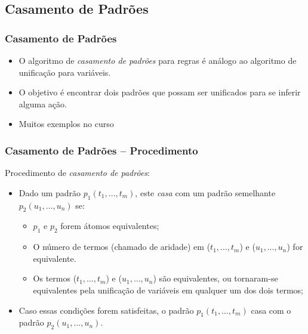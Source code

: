 
\subsection{Casamento de Padrões}

\begin{frame}[fragile]
\frametitle{Casamento de Padrões}

\begin{itemize}

\item O algoritmo de {\em casamento de padrões} para regras é análogo ao algoritmo de    unificação para variáveis. 

\item O objetivo é encontrar dois padrões que possam ser unificados para se inferir alguma ação.

\pause
\item Muitos exemplos no curso

\end{itemize}
\end{frame}



\begin{frame}[fragile]
\frametitle{Casamento de Padrões -- Procedimento}


Procedimento de {\em casamento de padrões}:

\begin{itemize}
	\item Dado um padrão $p_1(t_1, \ldots,t_m)$, este \emph{casa} 
	com um padrão semelhante $p_2(u_1, \ldots,u_n)$ se:
    
    \begin{itemize}
    	\item $p_1$ e $p_2$ forem átomos equivalentes;
    
        \item O número de termos (chamado de aridade) em ($t_1, \ldots,t_m$)
        e ($u_1, \ldots,u_n$) for equivalente.
    
    	\item Os termos ($t_1, \ldots,t_m$) e ($u_1, \ldots,u_n$) são equivalentes, ou tornaram-se  equivalentes pela unificação de variáveis	em qualquer um dos dois termos;
    \end{itemize}
    
    \item Caso essas condições forem satisfeitas, o padrão $p_1(t_1,\ldots,t_m)$  casa com o padrão $p_2(u_1, \ldots,u_n)$.
    
\end{itemize}        

\end{frame}

